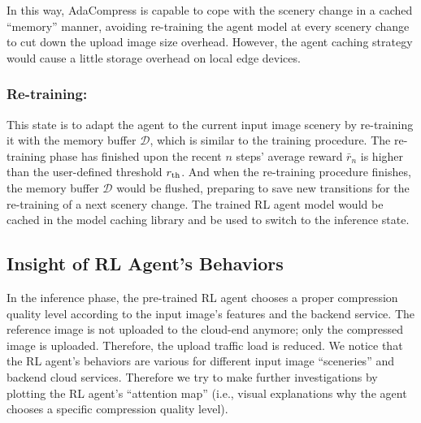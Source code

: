 In this way, AdaCompress is capable to cope with the scenery change in a cached ``memory'' manner, avoiding re-training the agent model at every scenery change to cut down the upload image size overhead. However, the agent caching strategy would cause a little storage overhead on local edge devices.


\subsubsection{Re-training:}

This state is to adapt the agent to the current input image scenery by re-training it with the memory buffer $ \mathcal{D} $, which is similar to the training procedure. The re-training phase has finished upon the recent $ n $ steps' average reward $ \bar{r}_n $ is higher than the user-defined threshold $ r_{\rm th} $. And when the re-training procedure finishes, the memory buffer $ \mathcal{D} $ would be flushed, preparing to save new transitions for the re-training of a next scenery change. The trained RL agent model would be cached in the model caching library and be used to switch to the inference state.

\subsection{Insight of RL Agent's Behaviors}
\label{subsec:insight}

In the inference phase, the pre-trained RL agent chooses a proper compression quality level according to the input image's features and the backend service. The reference image is not uploaded to the cloud-end anymore; only the compressed image is uploaded. Therefore, the upload traffic load is reduced. We notice that the RL agent's behaviors are various for different input image ``sceneries'' and backend cloud services. Therefore we try to make further investigations by plotting the RL agent's ``attention map'' (i.e., visual explanations why the agent chooses a specific compression quality level). %

